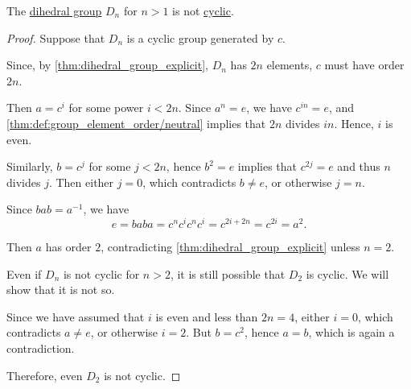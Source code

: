 \begin{proposition}\label{thm:dihedral_group_not_cyclic}
  The \hyperref[def:dihedral_group]{dihedral group} \( D_n \) for \( n > 1 \) is not \hyperref[def:cyclic_group]{cyclic}.
\end{proposition}
\begin{proof}
  Suppose that \( D_n \) is a cyclic group generated by \( c \).

  Since, by \cref{thm:dihedral_group_explicit}, \( D_n \) has \( 2n \) elements, \( c \) must have order \( 2n \).

  Then \( a = c^i \) for some power \( i < 2n \). Since \( a^n = e \), we have \( c^{in} = e \), and \cref{thm:def:group_element_order/neutral} implies that \( 2n \) divides \( in \). Hence, \( i \) is even.

  Similarly, \( b = c^j \) for some \( j < 2n \), hence \( b^2 = e \) implies that \( c^{2j} = e \) and thus \( n \) divides \( j \). Then either \( j = 0 \), which contradicts \( b \neq e \), or otherwise \( j = n \).

  Since \( bab = a^{-1} \), we have
  \begin{equation*}
    e = baba = c^n c^i c^n c^i = c^{2i + 2n} = c^{2i} = a^2.
  \end{equation*}

  Then \( a \) has order \( 2 \), contradicting \cref{thm:dihedral_group_explicit} unless \( n = 2 \).

  Even if \( D_n \) is not cyclic for \( n > 2 \), it is still possible that \( D_2 \) is cyclic. We will show that it is not so.

  Since we have assumed that \( i \) is even and less than \( 2n = 4 \), either \( i = 0 \), which contradicts \( a \neq e \), or otherwise \( i = 2 \). But \( b = c^2 \), hence \( a = b \), which is again a contradiction.

  Therefore, even \( D_2 \) is not cyclic.
\end{proof}

